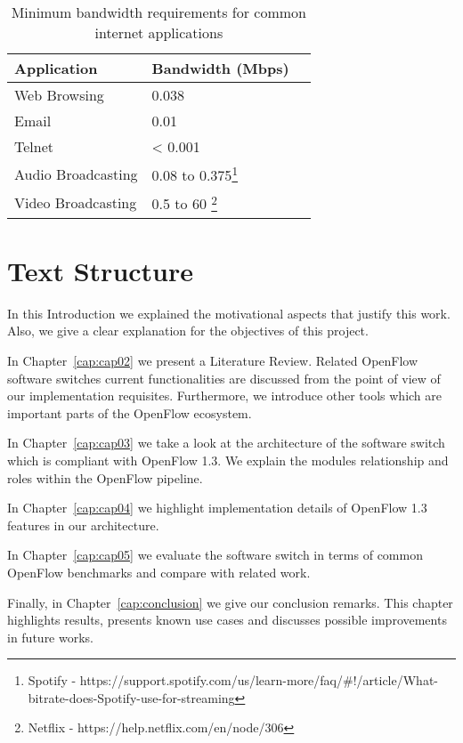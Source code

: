 \begin{enumerate}
\begin{savenotes}
    \begin{table}[h]
    \centering
    \caption{Minimum bandwidth requirements for common internet applications}
    \label{tab:appband}
    \begin{tabular}{|l|l|l|}
    \hline
    \textbf{Application}          & \textbf{Bandwidth (Mbps)}                         \\ \hline
    Web Browsing                      & 0.038                                        \\ \hline
    Email                             & 0.01                                          \\ \hline
    Telnet                            & < 0.001                                          \\ \hline
    Audio Broadcasting                & 0.08 to 0.375\footnote{Spotify - https://support.spotify.com/us/learn-more/faq/\#!/article/What-bitrate-does-Spotify-use-for-streaming}                                          \\ \hline
    Video Broadcasting                & 0.5 to 60 \footnote{Netflix - https://help.netflix.com/en/node/306}                                          \\ \hline
    
    \end{tabular}
    \end{table}
\end{savenotes}

\end{enumerate}

\pagebreak
\section{Text Structure}
\label{sec:sec03}

In this Introduction we explained the motivational aspects that justify this work. Also, we give a clear explanation for the objectives of this project. 

In Chapter~\ref{cap:cap02} we present a Literature Review. Related OpenFlow software switches current functionalities are discussed from the point of view of our implementation requisites. Furthermore, we introduce other tools which are important parts of the OpenFlow ecosystem. 

In Chapter~\ref{cap:cap03} we take a look at the architecture of the software switch which is compliant with OpenFlow 1.3. We explain the modules relationship and roles within the OpenFlow pipeline.

In Chapter~\ref{cap:cap04} we highlight implementation details of OpenFlow 1.3 features in our architecture.  

In Chapter~\ref{cap:cap05} we evaluate the software switch in terms of common OpenFlow benchmarks and compare with related work.

Finally, in Chapter~\ref{cap:conclusion} we give our conclusion remarks. This chapter highlights results, presents known use cases and discusses possible improvements in future works. 